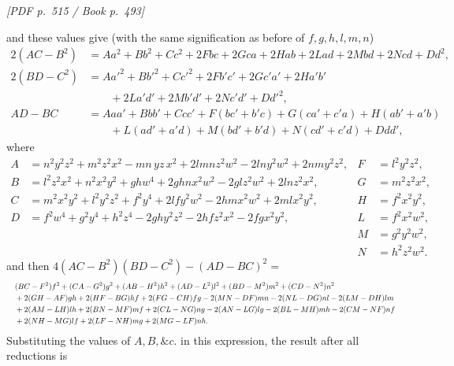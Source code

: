 \documentclass[11pt]{article}
\newcommand{\Page}[2]{\bigskip\noindent\textit{[PDF p.~#1 / Book p.~#2]}\par\smallskip}
\begin{document}
\Page{515}{493}

\noindent and these values give (with the same signification as before of $f,g,h,l,m,n$)
\[
\begin{aligned}
2(AC-B^2)&=Aa^2+Bb^2+Cc^2+2Fbc+2Gca+2Hab+2Lad+2Mbd+2Ncd+Dd^2,\\
2(BD-C^2)&=Aa'^2+Bb'^2+Cc'^2+2Fb'c'+2Gc'a'+2Ha'b'\\
&\qquad +2La'd'+2Mb'd'+2Nc'd'+Dd'^2,\\
AD-BC&=Aaa'+Bbb'+Ccc'+F(bc'+b'c)+G(ca'+c'a)+H(ab'+a'b)\\
&\qquad +L(ad'+a'd)+M(bd'+b'd)+N(cd'+c'd)+Ddd',
\end{aligned}
\]
where
\[
\begin{array}{rlrl}
A&=n^2y^2z^2+m^2z^2x^2-mn\,yz\,x^2+2lmnz^2w^2-2lny^2w^2+2nmy^2z^2,&
F&=l^2y^2z^2,\\
B&=l^2z^2x^2+n^2x^2y^2+ghw^4+2ghnx^2w^2-2glz^2w^2+2lnz^2x^2,&
G&=m^2z^2x^2,\\
C&=m^2x^2y^2+l^2y^2z^2+f^2y^4+2lfy^2w^2-2hmx^2w^2+2mlx^2y^2,&
H&=f^2x^2y^2,\\
D&=f^2w^4+g^2y^4+h^2z^4-2ghy^2z^2-2hfz^2x^2-2fgx^2y^2,&
L&=f^2x^2w^2,\\
&&M&=g^2y^2w^2,\\
&&N&=h^2z^2w^2.
\end{array}
\]
and then $4(AC-B^2)(BD-C^2)-(AD-BC)^2=$
\[
\resizebox{\textwidth}{!}{$\displaystyle
\begin{aligned}
&(BC-F^2)f^2+(CA-G^2)g^2+(AB-H^2)h^2+(AD-L^2)l^2+(BD-M^2)m^2+(CD-N^2)n^2\\
&+2(GH-AF)gh+2(HF-BG)hf+2(FG-CH)fg
-2(MN-DF)mn-2(NL-DG)nl-2(LM-DH)lm\\
&+2(AM-LH)lh+2(BN-MF)mf+2(CL-NG)ng
-2(AN-LG)lg-2(BL-MH)mh-2(CM-NF)nf\\
&+2(NH-MG)lf+2(LF-NH)mg+2(MG-LF)nh.
\end{aligned}$}
\]
Substituting the values of $A,B,\&c.$ in this expression, the result after all
reductions is
\end{document}
